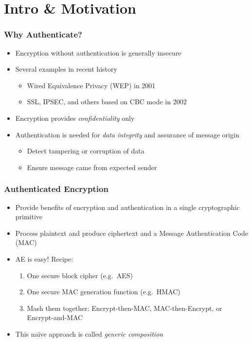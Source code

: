 \section{Intro \& Motivation}
\begin{frame}
\frametitle{Why Authenticate?}
\begin{itemize}
  \item Encryption without authentication is generally insecure
  \item Several examples in recent history
    \begin{itemize}
      \item Wired Equivalence Privacy (WEP) in 2001 \cite{Borisov2001_WEP}
      \item SSL, IPSEC, and others based on CBC mode in 2002 \cite{Vaudenay2002_CBC_Flaws}
    \end{itemize}
  \item Encryption provides \emph{confidentiality} only
  \item Authentication is needed for \emph{data integrity} and assurance of message origin
    \begin{itemize}
      \item Detect tampering or corruption of data
      \item Ensure message came from expected sender
    \end{itemize}
\end{itemize}
\end{frame}

\begin{frame}
\frametitle{Authenticated Encryption}
\begin{itemize}
  \item Provide benefits of encryption and authentication in a single cryptographic primitive
  \item Process plaintext and produce ciphertext and a Message Authentication Code (MAC)
  \item AE is easy! Recipe:
  \begin{enumerate}
    \item One secure block cipher (e.g.\ AES)
    \item One secure MAC generation function (e.g.\ HMAC)
    \item Mash them together: Encrypt-then-MAC, MAC-then-Encrypt, or Encrypt-and-MAC 
  \end{enumerate}
  \item This na{\"i}ve approach is called \emph{generic composition}
\end{itemize}
\end{frame}

